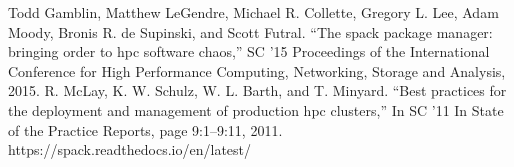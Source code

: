\documentclass[conference]{IEEEtran}
\begin{document}
\begin{thebibliography}{00}
 Todd Gamblin, Matthew LeGendre, Michael R. Collette, Gregory L. Lee, Adam Moody, Bronis R. de Supinski, and Scott Futral. ``The spack package manager: bringing order to hpc software chaos,'' SC ’15 Proceedings of the International Conference for High Performance Computing, Networking, Storage and Analysis, 2015.
 R. McLay, K. W. Schulz, W. L. Barth, and T. Minyard. ``Best practices for the deployment and management of production hpc clusters,'' In SC ’11 In State of the Practice Reports, page 9:1–9:11, 2011.
 https://spack.readthedocs.io/en/latest/
\end{thebibliography}
\end{document}
